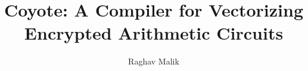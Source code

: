 \documentclass[pageno]{jpaper}
\title{Coyote: A Compiler for Vectorizing Encrypted Arithmetic Circuits}
\author{Raghav Malik}
\begin{document}

\maketitle









\pagebreak
\clearpage
% 


\end{document}
